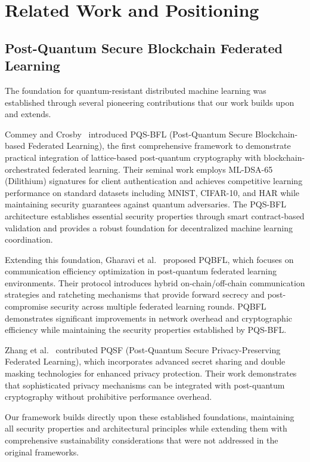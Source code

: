 \documentclass[10pt,journal,compsoc]{IEEEtran}
\begin{document}
\section{Related Work and Positioning}

\subsection{Post-Quantum Secure Blockchain Federated Learning}

The foundation for quantum-resistant distributed machine learning was established through several pioneering contributions that our work builds upon and extends.

Commey and Crosby~\cite{Commey2025} introduced PQS-BFL (Post-Quantum Secure Blockchain-based Federated Learning), the first comprehensive framework to demonstrate practical integration of lattice-based post-quantum cryptography with blockchain-orchestrated federated learning. Their seminal work employs ML-DSA-65 (Dilithium) signatures for client authentication and achieves competitive learning performance on standard datasets including MNIST, CIFAR-10, and HAR while maintaining security guarantees against quantum adversaries. The PQS-BFL architecture establishes essential security properties through smart contract-based validation and provides a robust foundation for decentralized machine learning coordination.

Extending this foundation, Gharavi et al.~\cite{Gharavi2025} proposed PQBFL, which focuses on communication efficiency optimization in post-quantum federated learning environments. Their protocol introduces hybrid on-chain/off-chain communication strategies and ratcheting mechanisms that provide forward secrecy and post-compromise security across multiple federated learning rounds. PQBFL demonstrates significant improvements in network overhead and cryptographic efficiency while maintaining the security properties established by PQS-BFL.

Zhang et al.~\cite{Zhang2024} contributed PQSF (Post-Quantum Secure Privacy-Preserving Federated Learning), which incorporates advanced secret sharing and double masking technologies for enhanced privacy protection. Their work demonstrates that sophisticated privacy mechanisms can be integrated with post-quantum cryptography without prohibitive performance overhead.

Our framework builds directly upon these established foundations, maintaining all security properties and architectural principles while extending them with comprehensive sustainability considerations that were not addressed in the original frameworks.
\end{document}
